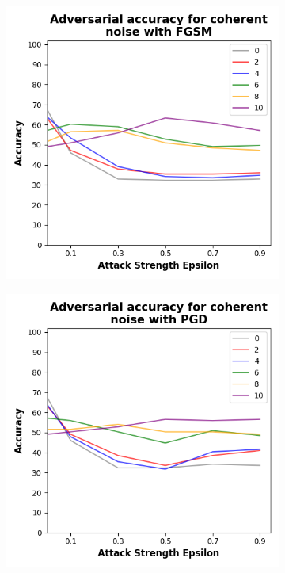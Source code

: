 \begin{figure}[!h]
  \centering

  \begin{subfigure}{0.45\textwidth}
      \includegraphics[width=\linewidth]{figures/evaluation_results/diabetes/pqc/figures/coherent-fgsm.png}
      \label{fig:diabetes9}
  \end{subfigure} \qquad
  \begin{subfigure}{0.45\textwidth}
      \includegraphics[width=\linewidth]{figures/evaluation_results/diabetes/pqc/figures/coherent-pgd.png}

\end{subfigure}
\end{figure}
